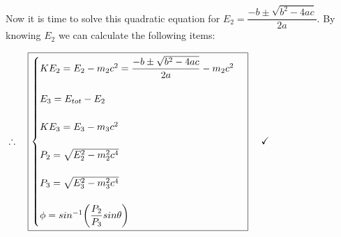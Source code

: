 \documentclass[fleqn]{article}
\begin{document}
Now it is time to solve this quadratic equation for $E_2=\dfrac{-b \pm \sqrt{b^2-4ac}}{2a}$. By knowing $E_2$ we can calculate the following items:

$
  \\
  \\
  \therefore ~~~ \boxed{
    \begin{cases}
      KE_2=E_2-m_2 c^2=\dfrac{-b \pm \sqrt{b^2-4ac}}{2a}-m_2 c^2
      \\
      \\
      E_3=E_{tot}-E_2
      \\
      \\
      KE_3=E_3-m_3 c^2
      \\
      \\
      P_2=\sqrt{E^2_2-m^2_2 c^4}
      \\
      \\
      P_3=\sqrt{E^2_3-m^2_3 c^4}
      \\
      \\
      \phi=sin^{-1} \bigg( \dfrac{P_2}{P_3}  sin \theta \bigg)
    \end{cases}
  } ~~~~ \checkmark
  \\
  \\
$
\end{document}
